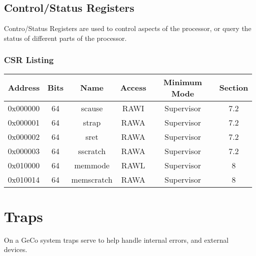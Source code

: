 \documentclass{article}
\begin{document}
\subsection{Control/Status Registers}
Contro/Status Registers are used to control aspects of the processor, or query the status of different parts of the processor.

\subsubsection{CSR Listing}
\begin{center}
\begin{tabular}{ |c|c|c|c|c|c| }
    \hline
    Address & Bits & Name & Access & Minimum Mode & Section \\
    \hline
    0x000000 & 64 & scause & RAWI & Supervisor & 7.2 \\
    \hline
    0x000001 & 64 & strap & RAWA & Supervisor & 7.2 \\
    \hline
    0x000002 & 64 & sret & RAWA & Supervisor & 7.2 \\
    \hline
    0x000003 & 64 & sscratch & RAWA & Supervisor & 7.2 \\
    \hline
    0x010000 & 64 & memmode & RAWL & Supervisor & 8 \\
    \hline
    0x010014 & 64 & memscratch & RAWA & Supervisor & 8 \\
    \hline
\end{tabular}
\end{center}

\section{Traps}
On a GeCo system traps serve to help handle internal errors, and external devices.
\end{document}
